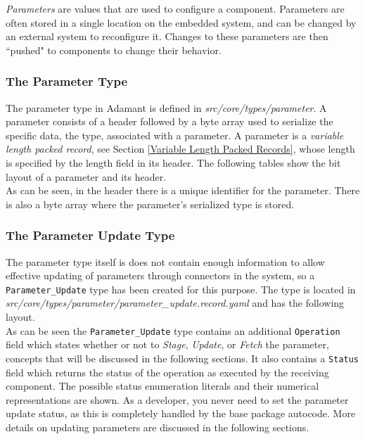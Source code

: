 \textit{Parameters} are values that are used to configure a component. Parameters are often stored in a single location on the embedded system, and can be changed by an external system to reconfigure it. Changes to these parameters are then ``pushed" to components to change their behavior.

\subsubsection{The Parameter Type}

The parameter type in Adamant is defined in \textit{src/core/types/parameter}. A parameter consists of a header followed by a byte array used to serialize the specific data, the type, associated with a parameter. A parameter is a \textit{variable length packed record}, see Section \ref{Variable Length Packed Records}, whose length is specified by the length field in its header. The following tables show the bit layout of a parameter and its header. \\




As can be seen, in the header there is a unique identifier for the parameter. There is also a byte array where the parameter's serialized type is stored. \\

\subsubsection{The Parameter Update Type} \label{The Parameter Update Type}

The parameter type itself is does not contain enough information to allow effective updating of parameters through connectors in the system, so a \texttt{Parameter\_Update} type has been created for this purpose. The type is located in \textit{src/core/types/parameter/parameter\_update.record.yaml} and has the following layout. \\



As can be seen the \texttt{Parameter\_Update} type contains an additional \texttt{Operation} field which states whether or not to \textit{Stage}, \textit{Update}, or \textit{Fetch} the parameter, concepts that will be discussed in the following sections. It also contains a \texttt{Status} field which returns the status of the operation as executed by the receiving component. The possible status enumeration literals and their numerical representations are shown. As a developer, you never need to set the parameter update status, as this is completely handled by the base package autocode.  More details on updating parameters are discussed in the following sections.

